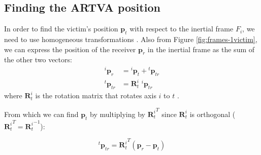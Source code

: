\subsection{Finding the ARTVA position}
In order to find the victim's position $\mathbf{p}_t$ with respect to the inertial frame $F_i$, we need to use homogeneous transformations \cite{book-robotics}. 
Also from Figure \ref{fig:frames-1victim}, we can express the position of the receiver $\mathbf{p}_r$ in the inertial frame as the sum of the other two vectors:
\[
\begin{aligned}
{}^i \mathbf{p}_r &= {}^i \mathbf{p}_t + {}^t \mathbf{p}_{tr} \\
{}^t \mathbf{p}_{tr} &= \mathbf{R}_t^i \,\, {}^i \mathbf{p}_{tr}
\end{aligned}
\]
where $\mathbf{R}_t^i$ is the rotation matrix that rotates axis $i$ to $t$ \cite{artva-gazebo}.

From which we can find $\mathbf{p}_t$ by multiplying by ${\mathbf{R}_t^i}^T$ since ${\mathbf{R}_t^i}$ is orthogonal (${\mathbf{R}_t^i}^T = {\mathbf{R}_t^i}^{-1}$):

\begin{equation}
    {}^t \mathbf{p}_{tr} = {\mathbf{R}_t^i}^T (\mathbf{p}_r - \mathbf{p}_t)
    \label{eq:pt}
\end{equation}

